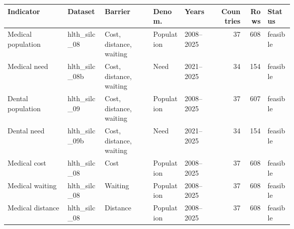 \begingroup
\scriptsize
\setlength{\tabcolsep}{3pt}
\begin{tabularx}{\linewidth}{@{}p{0.21\linewidth}p{0.13\linewidth}Yp{0.11\linewidth}p{0.12\linewidth}rrp{0.09\linewidth}@{}}
\toprule
Indicator & Dataset & Barrier & Denom. & Years & Countries & Rows & Status \\
\midrule
Medical population & hlth\_silc\_08 & Cost, distance, waiting & Population & 2008--2025 & 37 & 608 & feasible \\
Medical need & hlth\_silc\_08b & Cost, distance, waiting & Need & 2021--2025 & 34 & 154 & feasible \\
Dental population & hlth\_silc\_09 & Cost, distance, waiting & Population & 2008--2025 & 37 & 607 & feasible \\
Dental need & hlth\_silc\_09b & Cost, distance, waiting & Need & 2021--2025 & 34 & 154 & feasible \\
Medical cost & hlth\_silc\_08 & Cost & Population & 2008--2025 & 37 & 608 & feasible \\
Medical waiting & hlth\_silc\_08 & Waiting & Population & 2008--2025 & 37 & 608 & feasible \\
Medical distance & hlth\_silc\_08 & Distance & Population & 2008--2025 & 37 & 608 & feasible \\
\bottomrule
\end{tabularx}
\endgroup

